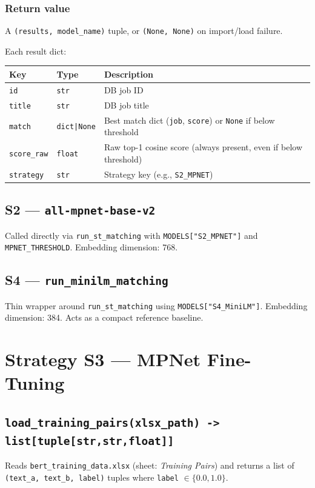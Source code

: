 ﻿\documentclass[12pt,a4paper]{article}
\begin{document}
\subsubsection*{Return value}
A \texttt{(results, model\_name)} tuple, or \texttt{(None, None)} on import/load failure.

Each result dict:
\begin{longtable}{@{}P{3.5cm}P{2.5cm}P{8.5cm}@{}}
\toprule
\textbf{Key} & \textbf{Type} & \textbf{Description} \\
\midrule
\endhead
\texttt{id} & \texttt{str} & DB job ID \\
\texttt{title} & \texttt{str} & DB job title \\
\texttt{match} & \texttt{dict|None} & Best match dict (\texttt{job}, \texttt{score}) or \texttt{None} if below threshold \\
\texttt{score\_raw} & \texttt{float} & Raw top-1 cosine score (always present, even if below threshold) \\
\texttt{strategy} & \texttt{str} & Strategy key (e.g., \texttt{S2\_MPNET}) \\
\bottomrule
\end{longtable}

\subsection{S2 --- \texttt{all-mpnet-base-v2}}
Called directly via \texttt{run\_st\_matching} with \texttt{MODELS["S2\_MPNET"]} and \texttt{MPNET\_THRESHOLD}. Embedding dimension: 768.

\subsection{S4 --- \texttt{run\_minilm\_matching}}
Thin wrapper around \texttt{run\_st\_matching} using \texttt{MODELS["S4\_MiniLM"]}. Embedding dimension: 384. Acts as a compact reference baseline.

\clearpage
\section{Strategy S3 --- MPNet Fine-Tuning}

\subsection{\texttt{load\_training\_pairs(xlsx\_path) -> list[tuple[str,str,float]]}}

Reads \texttt{bert\_training\_data.xlsx} (sheet: \textit{Training Pairs}) and returns a list of \texttt{(text\_a, text\_b, label)} tuples where \texttt{label} $\in \{0.0, 1.0\}$.
\end{document}
